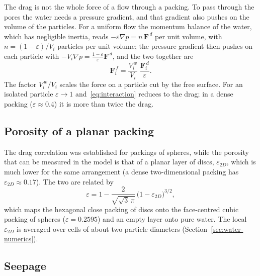 The drag is not the whole force of a flow through a packing.  To pass through
the pores the water needs a pressure gradient, and that gradient also pushes on
the volume of the particles.  For a uniform flow the momentum balance of the
water, which has negligible inertia, reads $-\varepsilon\nabla p = n\,
\mathbf{F}^{\,d}$ per unit volume, with $n=(1-\varepsilon)/V_{i}$ particles per
unit volume; the pressure gradient then pushes on each particle with
$-V_{i}\nabla p = \frac{1-\varepsilon}{\varepsilon}\mathbf{F}^{\,d}$, and the two
together are~\cite{zhou2010}
\begin{equation}
  \mathbf{F}_{i}^{\,f} = \frac{V_{i}^{\,w}}{V_{i}}\;\frac{\mathbf{F}_{i}^{\,d}}{\varepsilon}.
  \label{eq:interaction}
\end{equation}
The factor $V_{i}^{\,w}/V_{i}$ scales the force on a particle cut by the free
surface.  For an isolated particle $\varepsilon\to1$ and~\eqref{eq:interaction}
reduces to the drag; in a dense packing ($\varepsilon\approx0.4$) it is more than
twice the drag.

\subsection{Porosity of a planar packing}

The drag correlation was established for packings of spheres, while the
porosity that can be measured in the model is that of a planar layer of discs,
$\varepsilon_{2D}$, which is much lower for the same arrangement (a dense
two-dimensional packing has $\varepsilon_{2D}\approx0.17$).  The two are related
by~\cite{hoomans1996}
\begin{equation}
  \varepsilon = 1 - \frac{2}{\sqrt{\sqrt{3}\,\pi}}\,\bigl(1-\varepsilon_{2D}\bigr)^{3/2},
  \label{eq:porosity3d}
\end{equation}
which maps the hexagonal close packing of discs onto the face-centred cubic
packing of spheres ($\varepsilon=0.2595$) and an empty layer onto pure water.
The local $\varepsilon_{2D}$ is averaged over cells of about two particle
diameters (Section~\ref{sec:water-numerics}).

\subsection{Seepage}

